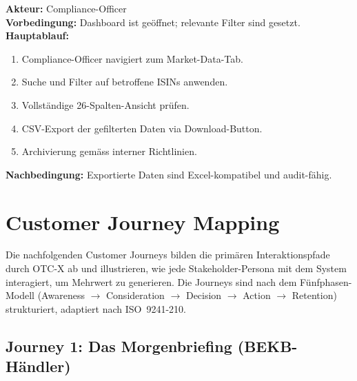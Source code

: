 \documentclass[12pt, a4paper, oneside]{report}
\begin{document}
\begin{usecasebox}
\textbf{Akteur:} Compliance-Officer\\[4pt]
\textbf{Vorbedingung:} Dashboard ist ge\"offnet; relevante Filter sind gesetzt.\\[4pt]
\textbf{Hauptablauf:}
\begin{enumerate}
  \item Compliance-Officer navigiert zum Market-Data-Tab.
  \item Suche und Filter auf betroffene ISINs anwenden.
  \item Vollst\"andige 26-Spalten-Ansicht pr\"ufen.
  \item CSV-Export der gefilterten Daten via Download-Button.
  \item Archivierung gem\"ass interner Richtlinien.
\end{enumerate}
\textbf{Nachbedingung:} Exportierte Daten sind Excel-kompatibel und audit-f\"ahig.
\end{usecasebox}


\chapter{Customer Journey Mapping}
\label{ch:customerjourney}

Die nachfolgenden Customer Journeys bilden die prim\"aren Interaktionspfade durch OTC-X ab und illustrieren, wie jede Stakeholder-Persona mit dem System interagiert, um Mehrwert zu generieren. Die Journeys sind nach dem F\"unfphasen-Modell (Awareness $\to$ Consideration $\to$ Decision $\to$ Action $\to$ Retention) strukturiert, adaptiert nach ISO~9241-210.

\section{Journey 1: Das Morgenbriefing (BEKB-H\"andler)}
\end{document}

